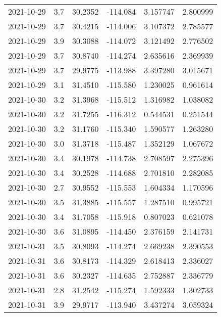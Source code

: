 \begin{tabular}{lrrrrr}
2021-10-29 &       3.7 &  30.2352 &  -114.084 &         3.157747 &         2.800999 \\
2021-10-29 &       3.7 &  30.4215 &  -114.006 &         3.107372 &         2.785577 \\
2021-10-29 &       3.9 &  30.3088 &  -114.072 &         3.121492 &         2.776502 \\
2021-10-29 &       3.7 &  30.8740 &  -114.274 &         2.635616 &         2.369939 \\
2021-10-29 &       3.7 &  29.9775 &  -113.988 &         3.397280 &         3.015671 \\
2021-10-29 &       3.1 &  31.4510 &  -115.580 &         1.230025 &         0.961614 \\
2021-10-30 &       3.2 &  31.3968 &  -115.512 &         1.316982 &         1.038082 \\
2021-10-30 &       3.2 &  31.7255 &  -116.312 &         0.544531 &         0.251544 \\
2021-10-30 &       3.2 &  31.1760 &  -115.340 &         1.590577 &         1.263280 \\
2021-10-30 &       3.0 &  31.3718 &  -115.487 &         1.352129 &         1.067672 \\
2021-10-30 &       3.4 &  30.1978 &  -114.738 &         2.708597 &         2.275396 \\
2021-10-30 &       3.4 &  30.2528 &  -114.688 &         2.701810 &         2.282085 \\
2021-10-30 &       2.7 &  30.9552 &  -115.553 &         1.604334 &         1.170596 \\
2021-10-30 &       3.5 &  31.3885 &  -115.557 &         1.287510 &         0.995721 \\
2021-10-30 &       3.4 &  31.7058 &  -115.918 &         0.807023 &         0.621078 \\
2021-10-30 &       3.6 &  31.0895 &  -114.450 &         2.376159 &         2.141731 \\
2021-10-31 &       3.5 &  30.8093 &  -114.274 &         2.669238 &         2.390553 \\
2021-10-31 &       3.6 &  30.8173 &  -114.329 &         2.618413 &         2.336027 \\
2021-10-31 &       3.6 &  30.2327 &  -114.635 &         2.752887 &         2.336779 \\
2021-10-31 &       2.8 &  31.2542 &  -115.274 &         1.592333 &         1.302733 \\
2021-10-31 &       3.9 &  29.9717 &  -113.940 &         3.437274 &         3.059324 \\

\end{tabular}
